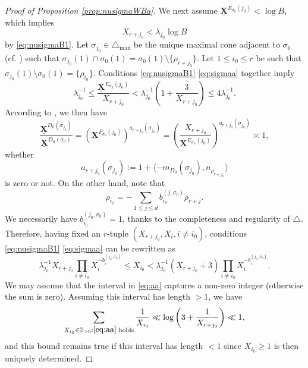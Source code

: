 \documentclass[11pt,letterpaper]{amsart}
\newcommand{\BZ}{{\mathbb {Z}}}
\newcommand{\XX}{\underline{\mathbf{X}}}
\theoremstyle{plain}
\numberwithin{equation}{section}
\theoremstyle{definition}
\theoremstyle{remark}
\begin{document}
\begin{proof}[Proof of Proposition \ref{prop:nusigmaWBa}]
We next assume $\XX^{E_{\sigma_0}(j_0)}<\log B$, which implies \begin{equation}\label{eq:Xr+j0}
	X_{r+j_0}< \lambda_{j_0}\log B 
\end{equation} by \eqref{eq:nusigmaB1}. 
Let $\sigma_{j_0}\in\triangle_{\max}$ be the unique maximal cone adjacent to $\sigma_0$ (cf. \cite[Lemma 8.9]{Salberger}) such that $\sigma_{j_0}(1)\cap \sigma_0(1)=\sigma_0(1)\setminus\{\rho_{r+j_0}\}$.  Let $1\leqslant i_0\leqslant r$ be such that $\sigma_{j_0}(1)\setminus\sigma_0(1)=\{\rho_{i_0}\}$. Conditions \eqref{eq:nusigmaB1} \eqref{eq:sigmaa} together imply $$\lambda_{j_0}^{-1}\leqslant\frac{\XX^{E_{\sigma_0}(j_0)}}{X_{r+j_0}}< \lambda_{j_0}^{-1}\left(1+\frac{3}{X_{r+j_0}}\right)\leqslant 4\lambda_{j_0}^{-1}.$$  According to \cite[Remark 11.23]{Salberger}, we then have $$\frac{\XX^{D_0(\sigma_{j_0})}}{\XX^{D_0(\sigma_0)}}=\left(\XX^{F_{\sigma_0}(j_0)}\right)^{a_{r+j_0}(\sigma_{j_0})}=\left(\frac{X_{r+j_0}}{\XX^{E_{\sigma_0}(j_0)}}\right)^{a_{r+j_0}(\sigma_{j_0})}\asymp 1,$$ whether $$a_{r+j_0}(\sigma_{j_0}):=1+\langle -m_{D_0}(\sigma_{j_0}),n_{\rho_{r+j_0}}\rangle$$ is zero or not. 
On the other hand, note that $$\rho_{i_0}=-\sum_{1\leqslant j\leqslant d}b_{i_0}^{(j,\sigma_0)}\rho_{r+j}.$$ We necessarily have $b_{i_0}^{(j_0,\sigma_0)}=1$, thanks to the completeness and regularity of $\triangle$.  
Therefore, having fixed an $r$-tuple $(X_{r+j_0},X_i,i\neq i_0)$, conditions \eqref{eq:nusigmaB1} \eqref{eq:sigmaa} can be rewritten as
\begin{equation}\label{eq:aa}
	\lambda_{j_0}^{-1}X_{r+j_0}\prod_{i\neq i_0} X_i^{-b_{i}^{(j_0,\sigma_0)}}\leqslant X_{i_0}< \lambda_{j_0}^{-1}(X_{r+j_0}+3)\prod_{i\neq i_0} X_i^{-b_{i}^{(j_0,\sigma_0)}}.
\end{equation}
We may assume that the interval in \eqref{eq:aa} captures a non-zero integer (otherwise the sum is zero). Assuming this interval has length $>1$, we have
$$\sum_{X_{i_0}\in\BZ_{>0}:\eqref{eq:aa} \text{ holds}} \frac{1}{X_{i_0}}\ll \log\left(3+\frac{1}{X_{r+j_0}}\right)\ll 1,$$ and this bound remains true if this interval has length $<1$ since $X_{i_0}\geqslant 1$ is then uniquely determined.


\end{proof}
\end{document}
